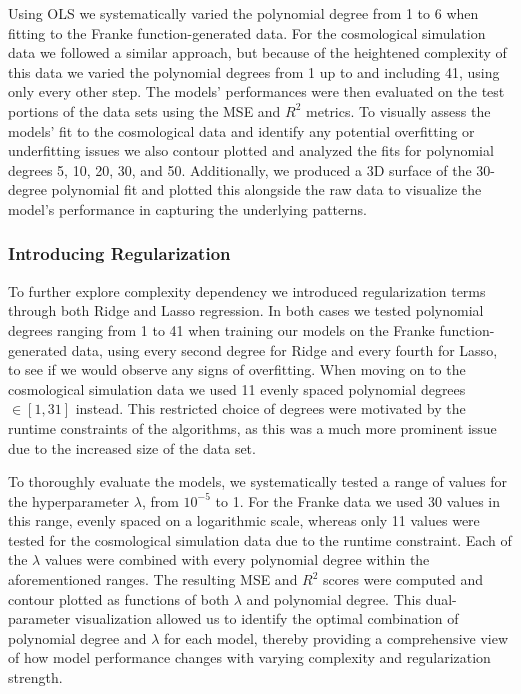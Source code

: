 \documentclass[aps,pra,english,notitlepage,reprint,nofootinbib]{revtex4-1}  %
\begin{document}
Using OLS we systematically varied the polynomial degree from 1 to 6 when fitting to the Franke function-generated data. For the cosmological simulation data we followed a similar approach, but because of the heightened complexity of this data we varied the polynomial degrees from 1 up to and including 41, using only every other step. The models' performances were then evaluated on the test portions of the data sets using the MSE and $R^2$ metrics. To visually assess the models' fit to the cosmological data and identify any potential overfitting or underfitting issues we also contour plotted and analyzed the fits for polynomial degrees 5, 10, 20, 30, and 50. Additionally, we produced a 3D surface of the 30-degree polynomial fit and plotted this alongside the raw data to visualize the model's performance in capturing the underlying patterns.

\subsubsection{Introducing Regularization}
To further explore complexity dependency we introduced regularization terms through both Ridge and Lasso regression. In both cases we tested polynomial degrees ranging from 1 to 41 when training our models on the Franke function-generated data, using every second degree for Ridge and every fourth for Lasso, to see if we would observe any signs of overfitting. When moving on to the cosmological simulation data we used 11 evenly spaced polynomial degrees $\in[1,31]$ instead. This restricted choice of degrees were motivated by the runtime constraints of the algorithms, as this was a much more prominent issue due to the increased size of the data set.

To thoroughly evaluate the models, we systematically tested a range of values for the hyperparameter $\lambda$, from $10^{-5}$ to 1. For the Franke data we used 30 values in this range, evenly spaced on a logarithmic scale, whereas only 11 values were tested for the cosmological simulation data due to the runtime constraint. Each of the $\lambda$ values were combined with every polynomial degree within the aforementioned ranges. The resulting MSE and $R^2$ scores were computed and contour plotted as functions of both $\lambda$ and polynomial degree. This dual-parameter visualization allowed us to identify the optimal combination of polynomial degree and $\lambda$ for each model, thereby providing a comprehensive view of how model performance changes with varying complexity and regularization strength.
\end{document}
